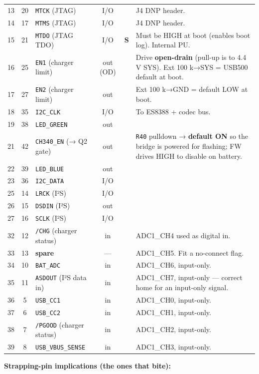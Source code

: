 \documentclass[11pt]{article}
\begin{document}
\begin{longtable}{@{}c c L{3.4cm} c c L{6.2cm}@{}}
13 & 20 & \texttt{MTCK} (JTAG) & I/O & & J4 DNP header. \\
14 & 17 & \texttt{MTMS} (JTAG) & I/O & & J4 DNP header. \\
15 & 21 & \texttt{MTDO} (JTAG TDO) & I/O & \textbf{S} & Must be HIGH at boot (enables boot log). Internal PU. \\
16 & 25 & \texttt{EN1} (charger limit) & out (OD) & & Drive \textbf{open-drain} (pull-up is to 4.4 V SYS). Ext 100 k→SYS = USB500 default at boot. \\
17 & 27 & \texttt{EN2} (charger limit) & out & & Ext 100 k→GND = default LOW at boot. \\
18 & 35 & \texttt{I2C_CLK} & I/O & & To ES8388 + codec bus. \\
19 & 38 & \texttt{LED_GREEN} & out & & \\
21 & 42 & \texttt{CH340_EN} (→ Q2 gate) & out & & \texttt{R40} pulldown → \textbf{default ON} so the bridge is powered for flashing; FW drives HIGH to disable on battery. \\
22 & 39 & \texttt{LED_BLUE} & out & & \\
23 & 36 & \texttt{I2C_DATA} & I/O & & \\
25 & 14 & \texttt{LRCK} (I²S) & I/O & & \\
26 & 15 & \texttt{DSDIN} (I²S) & out & & \\
27 & 16 & \texttt{SCLK} (I²S) & I/O & & \\
32 & 12 & \texttt{/CHG} (charger status) & in & & ADC1_CH4 used as digital in. \\
33 & 13 & \textbf{spare} & — & & ADC1_CH5. Fit a no-connect flag. \\
34 & 10 & \texttt{BAT_ADC} & in & & ADC1_CH6, input-only. \\
35 & 11 & \texttt{ASDOUT} (I²S data in) & in & & ADC1_CH7, input-only — correct home for an input-only signal. \\
36 & 5 & \texttt{USB_CC1} & in & & ADC1_CH0, input-only. \\
37 & 6 & \texttt{USB_CC2} & in & & ADC1_CH1, input-only. \\
38 & 7 & \texttt{/PGOOD} (charger status) & in & & ADC1_CH2, input-only. \\
39 & 8 & \texttt{USB_VBUS_SENSE} & in & & ADC1_CH3, input-only. \\
\bottomrule
\end{longtable}
\normalsize

\textbf{Strapping-pin implications (the ones that bite):}
\end{document}
